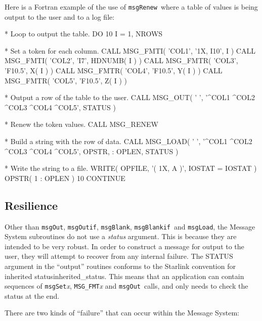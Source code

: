\documentclass[twoside,11pt]{starlink}
\providecommand{\func}[1]{\texttt{#1}}
\providecommand{\farg}[1]{\textit{#1}}
\providecommand{\msgblank}{\func{msgBlank}}
\providecommand{\msgblankif}{\func{msgBlankif}}
\providecommand{\msgload}{\func{msgLoad}}
\providecommand{\msgout}{\func{msgOut}}
\providecommand{\msgoutif}{\func{msgOutif}}
\providecommand{\msgrenew}{\func{msgRenew}}
\begin{document}
Here is a Fortran example of the use of \msgrenew\ where a table of values is being
output to the user and to a log file:

\begin {small}
\begin{terminalv}
*  Loop to output the table.
      DO 10 I = 1, NROWS

*     Set a token for each column.
         CALL MSG_FMTI( 'COL1', '1X, I10', I )
         CALL MSG_FMTI( 'COL2', 'I7', HDNUMB( I ) )
         CALL MSG_FMTR( 'COL3', 'F10.5', X( I ) )
         CALL MSG_FMTR( 'COL4', 'F10.5', Y( I ) )
         CALL MSG_FMTR( 'COL5', 'F10.5', Z( I ) )

*     Output a row of the table to the user.
         CALL MSG_OUT( ' ', '^COL1 ^COL2 ^COL3 ^COL4 ^COL5', STATUS )

*     Renew the token values.
         CALL MSG_RENEW

*     Build a string with the row of data.
         CALL MSG_LOAD( ' ', '^COL1 ^COL2 ^COL3 ^COL4 ^COL5', OPSTR,
     :                 OPLEN, STATUS )

*     Write the string to a file.
         WRITE( OPFILE, '( 1X, A )', IOSTAT = IOSTAT ) OPSTR( 1 : OPLEN )
 10   CONTINUE
\end{terminalv}
\end {small}


\subsection{Resilience}

Other than \msgout, \msgoutif, \msgblank, \msgblankif\ and \msgload, the Message System
subroutines do not use a \farg{status} argument.
This is because they are intended to be very robust.
In order to construct a message for output to the user, they will attempt to
recover from any internal failure.
The STATUS argument in the ``output'' routines conforms to the Starlink
convention for
\htmlref
{inherited status}{inherited_status}.
This means that an application can contain sequences of \func{msgSet}\textit{x},
\func{MSG\_FMT}\textit{x} and \msgout\ calls, and only needs to check the status at the
end.

There are two kinds of ``failure'' that can occur within the Message
System:
\end{document}
